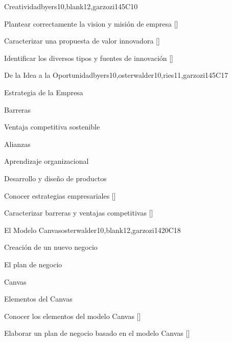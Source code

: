 \begin{syllabus}
\begin{unit}{}{Creatividad}{byers10,blank12,garzozi14}{5}{C10}
    \begin{learningoutcomes} 
      \item Plantear correctamente la vision y misión de empresa  [\Usage]
	  \item Caracterizar una propuesta de valor innovadora  [\Assessment]
      \item Identificar los diversos tipos y fuentes de innovación  [\Familiarity]
   \end{learningoutcomes} 
\end{unit}

\begin{unit}{}{De la Idea a la Oportunidad}{byers10,osterwalder10,ries11,garzozi14}{5}{C17}
\begin{topics}
      \item Estrategia de la Empresa
      \item Barreras 
      \item Ventaja competitiva sostenible
      \item Alianzas
      \item Aprendizaje organizacional
      \item Desarrollo y diseño de productos
   \end{topics}

  \begin{learningoutcomes} 
      \item Conocer estrategias empresariales  [\Familiarity]
      \item Caracterizar barreras y ventajas competitivas   [\Familiarity]
       
    \end{learningoutcomes} 
\end{unit}

\begin{unit}{}{El Modelo Canvas}{osterwalder10,blank12,garzozi14}{20}{C18}
	\begin{topics}
      \item Creación de un nuevo negocio
      \item El plan de negocio 
      \item Canvas
      \item Elementos del Canvas
   \end{topics}

  \begin{learningoutcomes} 
      \item Conocer los elementos del modelo Canvas  [\Usage]
      \item Elaborar un plan de negocio basado en el modelo Canvas  [\Usage]
    \end{learningoutcomes} 
\end{unit}


\end{syllabus}
